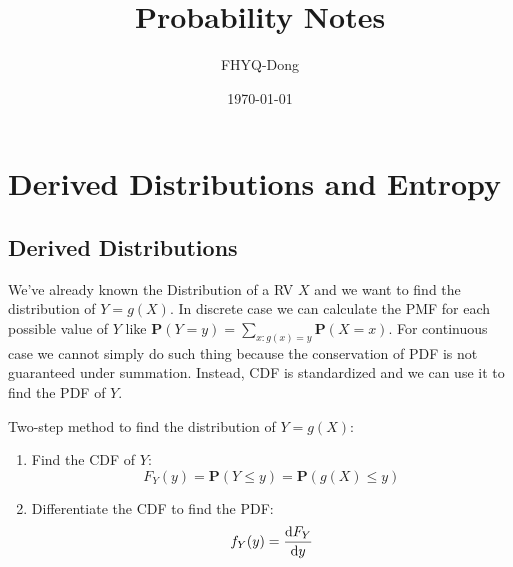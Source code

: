 \documentclass[device=normal, lang=en]{elegantbook}
\title{Probability Notes}
\author{FHYQ-Dong}
\date{\today}
\numberwithin{equation}{section}
\begin{document}
\maketitle
\frontmatter

\tableofcontents
\mainmatter













\chapter{Derived Distributions and Entropy}

\section{Derived Distributions}
\label{sec:derived-distributions}
We've already known the Distribution of a RV $X$ and we want to find the distribution of $Y = g(X)$. In discrete case we can calculate the PMF for each possible value of $Y$ like $\mathbf{P}(Y = y) = \sum_{x: g(x) = y} \mathbf{P}(X = x)$. For continuous case we cannot simply do such thing because the conservation of PDF is not guaranteed under summation. Instead, CDF is standardized and we can use it to find the PDF of $Y$.
\begin{theorem}
    Two-step method to find the distribution of $Y = g(X)$:
    \begin{enumerate}
        \item Find the CDF of $Y$:
        \begin{equation}
            F_{Y}(y) = \mathbf{P}(Y \leq y) = \mathbf{P}(g(X) \leq y)
        \end{equation}
        \item Differentiate the CDF to find the PDF:
        \begin{equation}
            f_{Y}(y) = \dv{F_{Y}}{y}
        \end{equation}
    \end{enumerate}
\end{theorem}
\end{document}
